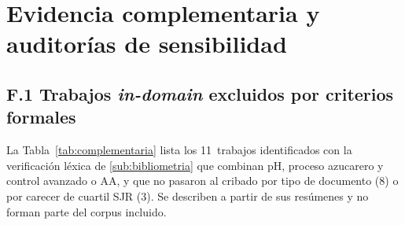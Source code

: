 \section{Evidencia complementaria y auditorías de sensibilidad}
\label{apx:complementaria}

\subsection*{F.1 Trabajos \textit{in-domain} excluidos por criterios formales}

La Tabla~\ref{tab:complementaria} lista los 11~trabajos identificados con
la verificación léxica de \ref{sub:bibliometria} que combinan pH,
proceso azucarero y control avanzado o AA, y que no pasaron al cribado por
tipo de documento (8) o por carecer de cuartil SJR (3). Se describen
a partir de sus resúmenes y no forman parte del corpus incluido.

